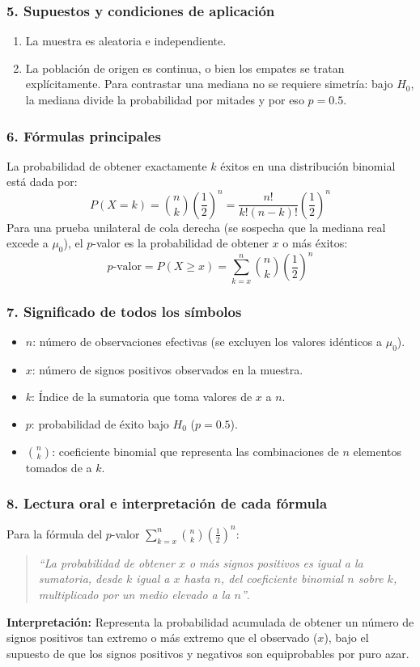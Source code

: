 \documentclass[11pt,a4paper]{article}
\begin{document}
\subsubsection{5. Supuestos y condiciones de aplicación}
\begin{enumerate}
    \item La muestra es aleatoria e independiente.
    \item La población de origen es continua, o bien los empates se tratan explícitamente. Para contrastar una mediana no se requiere simetría: bajo $H_0$, la mediana divide la probabilidad por mitades y por eso $p=0.5$.
\end{enumerate}

\subsubsection{6. Fórmulas principales}
La probabilidad de obtener exactamente $k$ éxitos en una distribución binomial está dada por:
\[ P(X = k) = \binom{n}{k} \left(\frac{1}{2}\right)^n = \frac{n!}{k!(n-k)!} \left(\frac{1}{2}\right)^n \]
Para una prueba unilateral de cola derecha (se sospecha que la mediana real excede a $\mu_0$), el $p$-valor es la probabilidad de obtener $x$ o más éxitos:
\[ p\text{-valor} = P(X \ge x) = \sum_{k=x}^{n} \binom{n}{k} \left(\frac{1}{2}\right)^n \]

\subsubsection{7. Significado de todos los símbolos}
\begin{itemize}
    \item $n$: número de observaciones efectivas (se excluyen los valores idénticos a $\mu_0$).
    \item $x$: número de signos positivos observados en la muestra.
    \item $k$: Índice de la sumatoria que toma valores de $x$ a $n$.
    \item $p$: probabilidad de éxito bajo $H_0$ ($p = 0.5$).
    \item $\binom{n}{k}$: coeficiente binomial que representa las combinaciones de $n$ elementos tomados de a $k$.
\end{itemize}

\subsubsection{8. Lectura oral e interpretación de cada fórmula}
Para la fórmula del $p$-valor $\sum_{k=x}^{n} \binom{n}{k} \left(\frac{1}{2}\right)^n$:
\begin{quote}
    \textit{``La probabilidad de obtener $x$ o más signos positivos es igual a la sumatoria, desde $k$ igual a $x$ hasta $n$, del coeficiente binomial $n$ sobre $k$, multiplicado por un medio elevado a la $n$''}.
\end{quote}
\textbf{Interpretación:} Representa la probabilidad acumulada de obtener un número de signos positivos tan extremo o más extremo que el observado ($x$), bajo el supuesto de que los signos positivos y negativos son equiprobables por puro azar.
\end{document}
